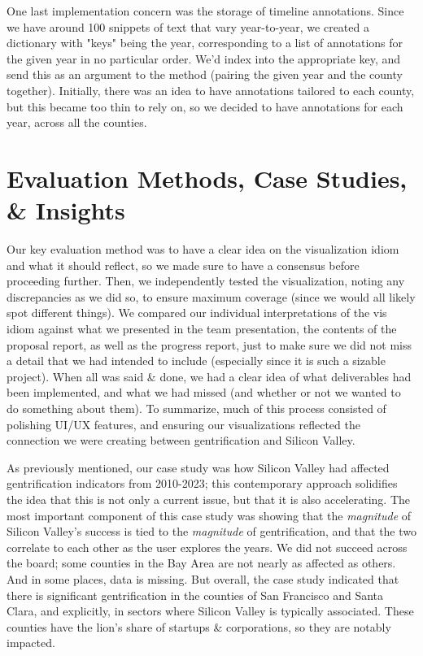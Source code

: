 \documentclass{article}
\begin{document}
    One last implementation concern was the storage of timeline annotations. Since we have around 100 snippets of text that vary year-to-year, we created a dictionary with "keys" being the year, corresponding to a list of annotations for the given year in no particular order. We'd index into the appropriate key, and send this as an argument to the method (pairing the given year and the county together). Initially, there was an idea to have annotations tailored to each county, but this became too thin to rely on, so we decided to have annotations for each year, across all the counties. 

\section{Evaluation Methods, Case Studies, \& Insights}
 
    Our key evaluation method was to have a clear idea on the visualization idiom and what it should reflect, so we made sure to have a consensus before proceeding further. Then, we independently tested the visualization, noting any discrepancies as we did so, to ensure maximum coverage (since we would all likely spot different things). We compared our individual interpretations of the vis idiom against what we presented in the team presentation, the contents of the proposal report, as well as the progress report, just to make sure we did not miss a detail that we had intended to include (especially since it is such a sizable project). When all was said \& done, we had a clear idea of what deliverables had been implemented, and what we had missed (and whether or not we wanted to do something about them). To summarize, much of this process consisted of polishing UI/UX features, and ensuring our visualizations reflected the connection we were creating between gentrification and Silicon Valley.
    
    As previously mentioned, our case study was how Silicon Valley had affected gentrification indicators from 2010-2023; this contemporary approach solidifies the idea that this is not only a current issue, but that it is also accelerating. The most important component of this case study was showing that the \textit{magnitude} of Silicon Valley's success is tied to the \textit{magnitude} of gentrification, and that the two correlate to each other as the user explores the years. We did not succeed across the board; some counties in the Bay Area are not nearly as affected as others. And in some places, data is missing. But overall, the case study indicated that there is significant gentrification in the counties of San Francisco and Santa Clara, and explicitly, in sectors where Silicon Valley is typically associated. These counties have the lion's share of startups \& corporations, so they are notably impacted.
    
\end{document}
